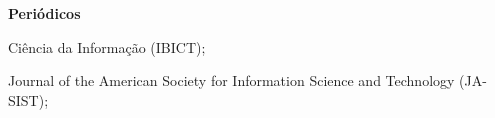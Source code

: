 \textbf{Periódicos}

\begin{list}{--}{}
  \item Ciência da Informação (IBICT);
  \item Journal of the American Society for Information Science and Technology
  (JA-SIST);
\end{list}


